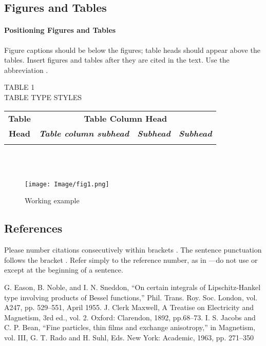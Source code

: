 \documentclass[conference]{IEEEtran}
\begin{document}
\subsection{Figures and Tables}
    \paragraph{Positioning Figures and Tables} Figure captions should be 
    below the figures; table heads should appear above the tables. Insert 
    figures and tables after they are cited in the text. Use the abbreviation 
.
\\

\begin{center}  TABLE 1\\
    \scriptsize{{\small T}ABLE {\small T}YPE {\small S}TYLES} \end{center}

\begin{tabular}{|c||c|c|c|}\hline
    \textbf{Table} &  \multicolumn{3}{|c|}{\textbf{ Table Column Head}} \\  \cline{2-4}
    \textbf{Head}  & \textbf{\textit{Table column subhead}}  &\textbf{\textit{Subhead}} &\textbf{\textit{Subhead}} \\\hline   
    &    &   &  \\ \hline 
\end{tabular}\\  \\

\begin{figure}[h]
    \centering
    \texttt{[image: Image/fig1.png]}
    \caption{Working example}
    \label{fig:1}
\end{figure}

\subsection{References}

Please number citations consecutively within brackets  \cite{b1}. The sentence punctuation follows the bracket  \cite{b2}. Refer simply to the reference number, as in  \cite{b3}---do not use  or  except at the beginning of a sentence.

\begin{thebibliography}{00}

     G. Eason, B. Noble, and I. N. Sneddon, ``On certain integrals of Lipschitz-Hankel type involving products of Bessel functions,'' Phil. Trans. Roy. Soc. London, vol. A247, pp. 529--551, April 1955.
     J. Clerk Maxwell, A Treatise on Electricity and Magnetism, 3rd ed., vol. 2. Oxford: Clarendon, 1892, pp.68--73.
     I. S. Jacobs and C. P. Bean, ``Fine particles, thin films and exchange anisotropy,'' in Magnetism, vol. III, G. T. Rado and H. Suhl, Eds. New York: Academic, 1963, pp. 271--350

\end{thebibliography}
\end{document}
